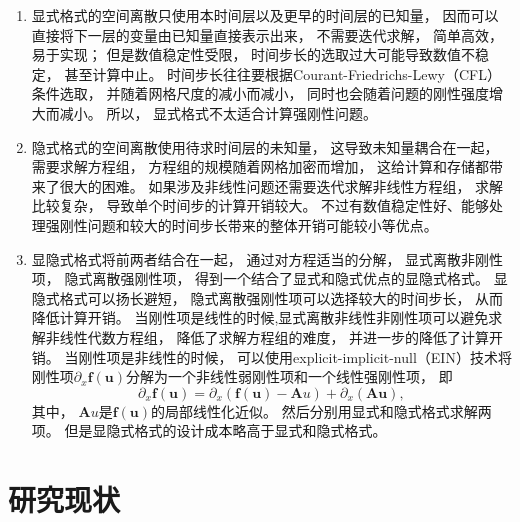 \begin{enumerate}
  \item 显式格式的空间离散只使用本时间层以及更早的时间层的已知量，
        因而可以直接将下一层的变量由已知量直接表示出来，
        不需要迭代求解，
        简单高效，
        易于实现；
        但是数值稳定性受限，
        时间步长的选取过大可能导致数值不稳定，
        甚至计算中止。
        时间步长往往要根据Courant-Friedrichs-Lewy（CFL）条件选取，
        并随着网格尺度的减小而减小，
        同时也会随着问题的刚性强度增大而减小。
        所以，
        显式格式不太适合计算强刚性问题。
  \item 隐式格式的空间离散使用待求时间层的未知量，
        这导致未知量耦合在一起，
        需要求解方程组，
        方程组的规模随着网格加密而增加，
        这给计算和存储都带来了很大的困难。
        如果涉及非线性问题还需要迭代求解非线性方程组，
        求解比较复杂，
        导致单个时间步的计算开销较大。
        不过有数值稳定性好、能够处理强刚性问题和较大的时间步长带来的整体开销可能较小等优点。
  \item 显隐式格式将前两者结合在一起，
        通过对方程适当的分解，
        显式离散非刚性项，
        隐式离散强刚性项，
        得到一个结合了显式和隐式优点的显隐式格式。
        显隐式格式可以扬长避短，
        隐式离散强刚性项可以选择较大的时间步长，
        从而降低计算开销。
        当刚性项是线性的时候,显式离散非线性非刚性项可以避免求解非线性代数方程组，
        降低了求解方程组的难度，
        并进一步的降低了计算开销。
        当刚性项是非线性的时候，
        可以使用explicit-implicit-null（EIN）技术将刚性项${\partial_x} {\bm f}({\bm u})$分解为一个非线性弱刚性项和一个线性强刚性项，
        即
        \begin{equation}
          {\partial_x} {\bm f}({\bm u}) = {\partial_x} \left({\bm f}({\bm u})-{\bm A}u\right) + {\partial_x} \left({\bm A}{\bm u}\right),
        \end{equation}
        其中，
        ${\bm A}u$是${\bm f}({\bm u})$的局部线性化近似。
        然后分别用显式和隐式格式求解两项。
        但是显隐式格式的设计成本略高于显式和隐式格式。
\end{enumerate}

\section{研究现状}

